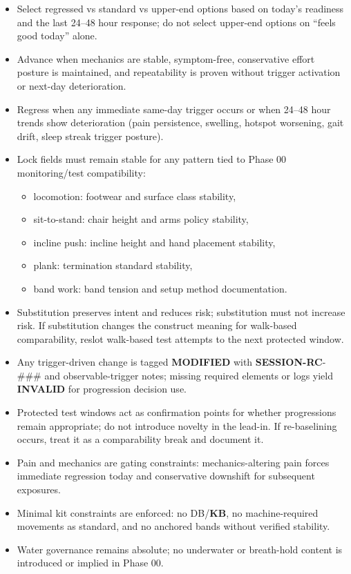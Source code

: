 \documentclass[10pt]{article}
\begin{document}
\begin{itemize}
\item Select regressed vs standard vs upper-end options based on today’s readiness and the last 24–48 hour response; do not select upper-end options on “feels good today” alone.
\item Advance when mechanics are stable, symptom-free, conservative effort posture is maintained, and repeatability is proven without trigger activation or next-day deterioration.
\item Regress when any immediate same-day trigger occurs or when 24–48 hour trends show deterioration (pain persistence, swelling, hotspot worsening, gait drift, sleep streak trigger posture).
\item Lock fields must remain stable for any pattern tied to Phase 00 monitoring/test compatibility:
  \begin{itemize}
  \item locomotion: footwear and surface class stability,
  \item sit-to-stand: chair height and arms policy stability,
  \item incline push: incline height and hand placement stability,
  \item plank: termination standard stability,
  \item band work: band tension and setup method documentation.
  \end{itemize}
\item Substitution preserves intent and reduces risk; substitution must not increase risk. If substitution changes the construct meaning for walk-based comparability, reslot walk-based test attempts to the next protected window.
\item Any trigger-driven change is tagged \textbf{MODIFIED} with \textbf{SESSION-RC}-\#\#\# and observable-trigger notes; missing required elements or logs yield \textbf{INVALID} for progression decision use.
\item Protected test windows act as confirmation points for whether progressions remain appropriate; do not introduce novelty in the lead-in. If re-baselining occurs, treat it as a comparability break and document it.
\item Pain and mechanics are gating constraints: mechanics-altering pain forces immediate regression today and conservative downshift for subsequent exposures.
\item Minimal kit constraints are enforced: no DB/\textbf{KB}, no machine-required movements as standard, and no anchored bands without verified stability.
\item Water governance remains absolute; no underwater or breath-hold content is introduced or implied in Phase 00.
\end{itemize}
\end{document}
